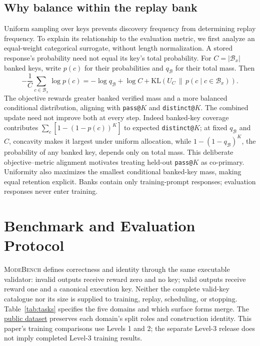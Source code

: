 \documentclass{article}
\newcommand{\1}{\mathbf 1}
\newcommand{\mb}{\textsc{ModeBench}}
\theoremstyle{remark}
\theoremstyle{definition}
\theoremstyle{plain}
\begin{document}
\subsection{Why balance within the replay bank}
\label{app:replay-metric-alignment}

Uniform sampling over keys prevents discovery frequency from determining replay
frequency. To explain its relationship to the evaluation metric, we first
analyze an equal-weight categorical surrogate, without length normalization.
A stored response's probability need not equal its key's total probability.
For $C=|\mathcal B_x|$ banked keys, write $p(c)$ for their probabilities
and $q_{\mathcal B}$ for their total mass. Then
\begin{equation}
 -\frac1C\sum_{c\in\mathcal B_x}\log p(c)
 =-\log q_{\mathcal B}+\log C+
   \mathrm{KL}\!\left(U_C\,\|\,
   p(c\mid c\in\mathcal B_x)\right).
 \label{eq:replay-bank-decomposition}
\end{equation}
The objective rewards greater banked verified mass and a more balanced
conditional distribution, aligning with \texttt{pass@}$K$ and
\texttt{distinct@}$K$. The combined update need not improve both at every step. Indeed banked-key coverage contributes
$\sum_c[1-(1-p(c))^K]$ to expected \texttt{distinct@}$K$; at fixed
$q_{\mathcal B}$ and $C$, concavity makes it largest under uniform allocation,
while $1-(1-q_{\mathcal B})^K$, the probability of any banked key, depends
only on total mass. This deliberate objective--metric alignment motivates
treating held-out \texttt{pass@}$K$ as co-primary. Uniformity also maximizes the
smallest conditional banked-key mass, making equal retention explicit. Banks
contain only training-prompt responses; evaluation responses never enter
training.



\section{Benchmark and Evaluation Protocol}
\label{app:data}
\label{app:experimental-design}
\label{app:domain-overview}
\label{app:data-inventory}

\mb{} defines correctness and identity through the same executable validator:
invalid outputs receive reward zero and no key; valid outputs receive reward
one and a canonical execution key. Neither the complete valid-key catalogue
nor its size is supplied to training, replay, scheduling, or stopping.
Table~\ref{tab:tasks} specifies the five domains and which surface forms merge.
The \href{https://huggingface.co/datasets/od2961/ModeBench}{public dataset}
preserves each domain's split roles and construction identity. This paper's
training comparisons use Levels 1 and 2; the separate Level-3 release does
not imply completed Level-3 training results.
\end{document}
